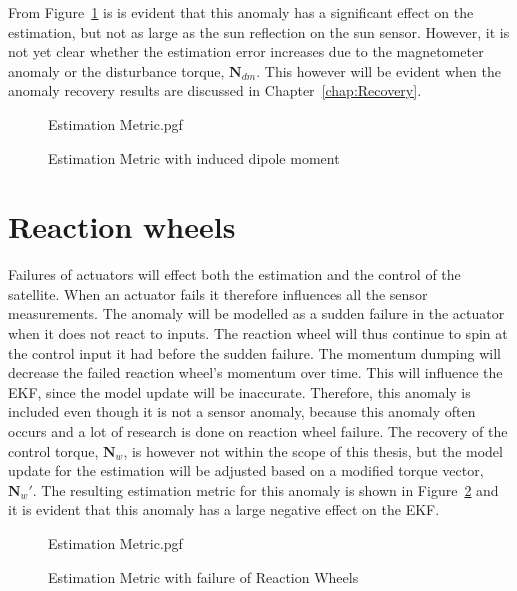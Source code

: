 From Figure~\ref{fig:solarPanelDipoleOnEstimation} is is evident that this anomaly has a significant effect on the estimation, but not as large as the sun reflection on the sun sensor. However, it is not yet clear whether the estimation error increases due to the magnetometer anomaly or the disturbance torque, $\mathbf{N}_{dm}$. This however will be evident when the anomaly recovery results are discussed in Chapter~\ref{chap:Recovery}.

\begin{figure}[!htb]
	\centering
	
	{Estimation Metric.pgf}
	
	\caption{Estimation Metric with induced dipole moment}
	\label{fig:solarPanelDipoleOnEstimation}
\end{figure}

\section{Reaction wheels}
Failures of actuators will effect both the estimation and the control of the satellite. When an actuator fails it therefore influences all the sensor measurements. The anomaly will be modelled as a sudden failure in the actuator when it does not react to inputs. The reaction wheel will thus continue to spin at the control input it had before the sudden failure. The momentum dumping will decrease the failed reaction wheel's momentum over time. This will influence the EKF, since the model update will be inaccurate. Therefore, this anomaly is included even though it is not a sensor anomaly, because this anomaly often occurs and a lot of research is done on reaction wheel failure. The recovery of the control torque, $\mathbf{N}_w$, is however not within the scope of this thesis, but the model update for the estimation will be adjusted based on a modified torque vector, $\mathbf{N}_w'$. The resulting estimation metric for this anomaly is shown in Figure~\ref{fig:catastrophicReactionWheels} and it is evident that this anomaly has a large negative effect on the EKF.

\begin{figure}[!htb]
\centering

{Estimation Metric.pgf}

\caption{Estimation Metric with failure of Reaction Wheels}
\label{fig:catastrophicReactionWheels}
\end{figure}

